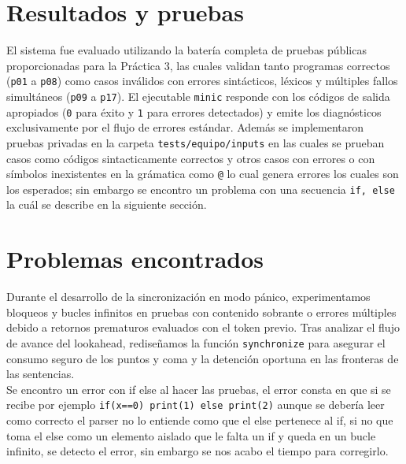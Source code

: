 \documentclass[12pt, letterpaper]{article}
\begin{document}
\section{Resultados y pruebas}
El sistema fue evaluado utilizando la batería completa de pruebas públicas proporcionadas para la Práctica 3, las cuales validan tanto programas correctos (\texttt{p01} a \texttt{p08}) como casos inválidos con errores sintácticos, léxicos y múltiples fallos simultáneos (\texttt{p09} a \texttt{p17}). El ejecutable \texttt{minic} responde con los códigos de salida apropiados (\texttt{0} para éxito y \texttt{1} para errores detectados) y emite los diagnósticos exclusivamente por el flujo de errores estándar. Además se implementaron pruebas privadas en la carpeta \texttt{tests/equipo/inputs} en las cuales se prueban casos como códigos sintacticamente correctos y otros casos con errores o con símbolos inexistentes en la grámatica como \texttt{@} lo cual genera errores los cuales son los esperados; sin embargo se encontro un problema con una secuencia \texttt{if, else} la cuál se describe en la siguiente sección.

\section{Problemas encontrados}
Durante el desarrollo de la sincronización en modo pánico, experimentamos bloqueos y bucles infinitos en pruebas con contenido sobrante o errores múltiples debido a retornos prematuros evaluados con el token previo. Tras analizar el flujo de avance del lookahead, rediseñamos la función \texttt{synchronize} para asegurar el consumo seguro de los puntos y coma y la detención oportuna en las fronteras de las sentencias.\\
Se encontro un error con if else al hacer las pruebas, el error consta en que si se recibe por ejemplo \texttt{if(x==0) print(1) else print(2)} aunque se debería leer como correcto el parser no lo entiende como que el else pertenece al if, si no que toma el else como un elemento aislado que le falta un if y queda en un bucle infinito, se detecto el error, sin embargo se nos acabo el tiempo para corregirlo.

\end{document}

